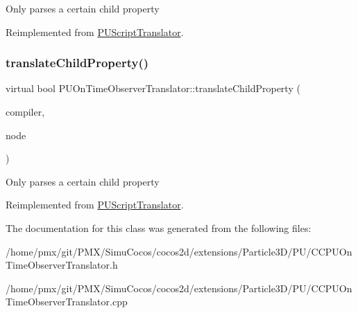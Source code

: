 Only parses a certain child property 

Reimplemented from \hyperlink{classPUScriptTranslator_a0374d83a8a04e57918975d525e0f8fe8}{P\+U\+Script\+Translator}.

\mbox{\label{classPUOnTimeObserverTranslator_a0351110957616a2658cfc2215c626e9d}} 
\subsubsection{\texorpdfstring{translate\+Child\+Property()}{translateChildProperty()}\hspace{0.1cm}{\footnotesize\ttfamily [2/2]}}
{\footnotesize\ttfamily virtual bool P\+U\+On\+Time\+Observer\+Translator\+::translate\+Child\+Property (\begin{DoxyParamCaption}\item[{\hyperlink{classPUScriptCompiler}{P\+U\+Script\+Compiler} $\ast$}]{compiler,  }\item[{\hyperlink{classPUAbstractNode}{P\+U\+Abstract\+Node} $\ast$}]{node }\end{DoxyParamCaption})\hspace{0.3cm}{\ttfamily [virtual]}}

Only parses a certain child property 

Reimplemented from \hyperlink{classPUScriptTranslator_a0374d83a8a04e57918975d525e0f8fe8}{P\+U\+Script\+Translator}.



The documentation for this class was generated from the following files\+:\begin{DoxyCompactItemize}
\item 
/home/pmx/git/\+P\+M\+X/\+Simu\+Cocos/cocos2d/extensions/\+Particle3\+D/\+P\+U/C\+C\+P\+U\+On\+Time\+Observer\+Translator.\+h\item 
/home/pmx/git/\+P\+M\+X/\+Simu\+Cocos/cocos2d/extensions/\+Particle3\+D/\+P\+U/C\+C\+P\+U\+On\+Time\+Observer\+Translator.\+cpp\end{DoxyCompactItemize}
